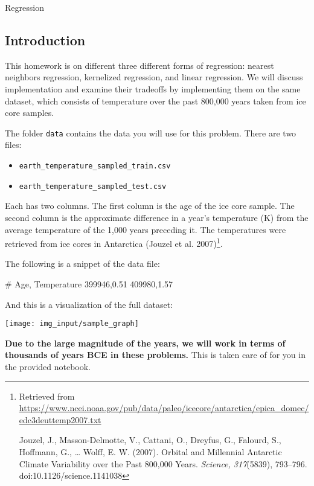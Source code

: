 \documentclass[submit]{../harvardml}
\begin{document}
\begin{center}
  {\Large Regression}
\end{center}

\subsection*{Introduction}

This homework is on different three different forms of regression:
nearest neighbors regression, kernelized regression, and linear
regression.  We will discuss implementation and examine their
tradeoffs by implementing them on the same dataset, which consists of
temperature over the past 800,000 years taken from ice core samples.

The folder \verb|data| contains the data you will use for this
problem. There are two files:
\begin{itemize}
  \item \verb|earth_temperature_sampled_train.csv|
  \item \verb|earth_temperature_sampled_test.csv|
\end{itemize}

Each has two columns.  The first column is the age of the ice core
sample.  The second column is the approximate difference in a year's temperature (K)
from the average temperature of the 1,000 years preceding it. The temperatures were retrieved from ice cores in
Antarctica (Jouzel et al. 2007)\footnote{Retrieved from
  \url{https://www.ncei.noaa.gov/pub/data/paleo/icecore/antarctica/epica_domec/edc3deuttemp2007.txt}

  Jouzel, J., Masson-Delmotte, V., Cattani, O., Dreyfus, G., Falourd,
  S., Hoffmann, G., … Wolff, E. W. (2007). Orbital and Millennial
  Antarctic Climate Variability over the Past 800,000 Years.
  \emph{Science, 317}(5839), 793–796. doi:10.1126/science.1141038}.

The following is a snippet of the data file:

\begin{csv}
  # Age, Temperature
  399946,0.51
  409980,1.57
\end{csv}

\noindent And this is a visualization of the full dataset:
\begin{center}
  \texttt{[image: img\_input/sample\_graph]}
\end{center}
\noindent


\textbf{Due to the large magnitude of the years, we will work in terms
  of thousands of years BCE in these problems.} This is taken care of
for you in the provided notebook.
\end{document}
